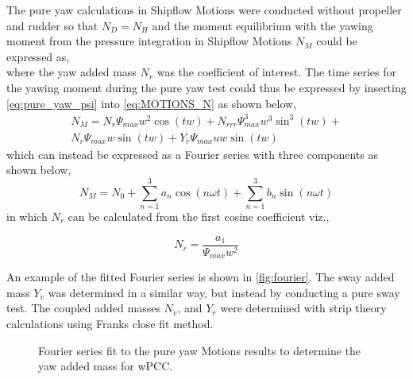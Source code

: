 The pure yaw calculations in Shipflow Motions were conducted without propeller and rudder so that $N_D=N_H$ and the moment equilibrium with the yawing moment from the pressure integration in Shipflow Motions $N_M$ could be expressed as, 
\begin{equation}
    
    \label{eq:MOTIONS_N}
\end{equation}
where the yaw added mass $N_{\dot{r}}$ was the coefficient of interest. 
The time series for the yawing moment during the pure yaw test could thus be expressed by inserting \autoref{eq:pure_yaw_psi}  into \autoref{eq:MOTIONS_N} as shown below,
\begin{equation}
    \begin{align}    
    N_{M} = N_{\dot{r}} \Psi_{max} w^{2} \cos{\left(t w \right)} + N_{rrr} \Psi_{max}^{3} w^{3} \sin^{3}{\left(t w \right)} + \\ 
    N_{r} \Psi_{max} w \sin{\left(t w \right)} + Y_{\dot{r}} \Psi_{max} u w \sin{\left(t w \right)}
    \end{align}
    \label{eq:MOTIONS_N_expanded}
\end{equation}
which can instead be expressed as a Fourier series with three components as shown below,
\begin{equation}
    N_M = N_0 + \sum_{n=1}^3a_n \cos(n \omega t) + \sum_{n=1}^3b_n \sin(n \omega t) 
    \label{eq:fourier}
\end{equation}
in which $N_{\dot{r}}$ can be calculated from the first cosine coefficient viz.,

\begin{equation}
    N_{\dot{r}} = \frac{a_1}{\Psi_{max} w^{2}}
    \label{eq:N_r1d}
\end{equation}

An example of the fitted Fourier series is shown in \autoref{fig:fourier}. The sway added mass $Y_{\dot{v}}$ was determined in a similar way, but instead by conducting a pure sway test. The coupled added masses $N_{\dot{v}}$, and $Y_{\dot{r}}$ were determined with strip theory calculations using Franks close fit method. 

\begin{figure}[h!]
    \centering   
    \caption{Fourier series fit to the pure yaw Motions results to determine the yaw added mass for wPCC.}
    \label{fig:fourier}
\end{figure}